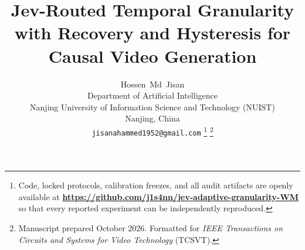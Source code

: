 \documentclass[journal]{IEEEtran}
\begin{document}
\linespread{0.96}\selectfont

\title{Jev-Routed Temporal Granularity with Recovery and Hysteresis for Causal Video Generation}

\author{Hossen~Md~Jisan\\
Department of Artificial Intelligence\\
Nanjing University of Information Science and Technology (NUIST)\\
Nanjing, China\\
\texttt{jisanahammed1952@gmail.com}%
\thanks{Code, locked protocols, calibration freezes, and all audit artifacts are openly available at \href{https://github.com/j1s4nn/jev-adaptive-granularity-WM}{\textbf{https://github.com/j1s4nn/jev-adaptive-granularity-WM}} so that every reported experiment can be independently reproduced.}%
\thanks{Manuscript prepared October 2026. Formatted for \emph{IEEE Transactions on Circuits and Systems for Video Technology} (TCSVT).}}


\maketitle
\end{document}
